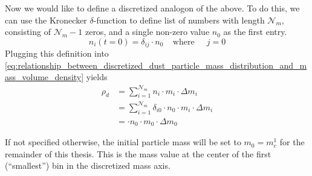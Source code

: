     Now we would like to define a discretized analogon of the above.
    To do this, we can use the Kronecker $\delta$-function to define list of numbers with length
    $\mathcal N_m$, consisting of $\mathcal N_m-1$ zeros, and a single non-zero value $n_0$ as the 
    first entry.
    \begin{equation}
        n_i(t=0) = \delta_{ij} \cdot n_0
        \ \ \ \ \ \text{where } \ \ \ \ \ 
        j=0
    \end{equation}
    Plugging this definition into 
    \cref{eq:relationship_between_discretized_dust_particle_mass_distribution_and_mass_volume_density}
    yields
    \begin{align}
        \rho_d 
            &= \sum_{i=1}^{\mathcal N_m} n_i \cdot m_i \cdot \Delta m_i \\
            &= \sum_{i=1}^{\mathcal N_m} \delta_{i0} \cdot n_0 \cdot m_i \cdot \Delta m_i \\
            &= \cdot n_0 \cdot m_0 \cdot \Delta m_0
    \end{align}


    If not specified otherwise, the initial particle mass will be set to $m_0 = m_c^1$ for the
    remainder of this thesis. This is the mass value at the center of the first (``smallest'') bin 
    in the discretized mass axis.












































